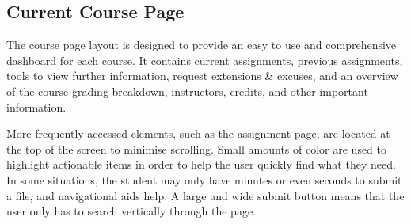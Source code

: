 \subsection{Current Course Page}

The course page layout is designed to provide an easy to use and comprehensive dashboard for each course. It contains current assignments, previous assignments, tools to view further information, request extensions \& excuses, and an overview of the course grading breakdown, instructors, credits, and other important information.

More frequently accessed elements, such as the assignment page, are located at the top of the screen to minimise scrolling. Small amounts of color are used to highlight actionable items in order to help the user quickly find what they need. In some situations, the student may only have minutes or even seconds to submit a file, and navigational aids help. A large and wide submit button means that the user only has to search vertically through the page.
